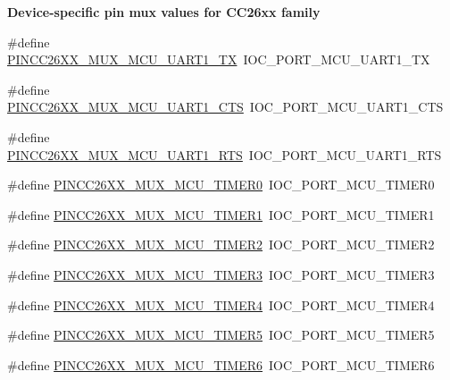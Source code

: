 \begin{Indent}{\bf Device-\/specific pin mux values for C\+C26xx family}
\begin{DoxyCompactItemize}
\item 
\#define \hyperlink{_p_i_n_c_c26_x_x_8h_a86f90a7c527db111500f481c32503c0e}{P\+I\+N\+C\+C26\+X\+X\+\_\+\+M\+U\+X\+\_\+\+M\+C\+U\+\_\+\+U\+A\+R\+T1\+\_\+\+T\+X}~I\+O\+C\+\_\+\+P\+O\+R\+T\+\_\+\+M\+C\+U\+\_\+\+U\+A\+R\+T1\+\_\+\+T\+X
\item 
\#define \hyperlink{_p_i_n_c_c26_x_x_8h_a7e579ca0aee2428813b15c97ba23d28b}{P\+I\+N\+C\+C26\+X\+X\+\_\+\+M\+U\+X\+\_\+\+M\+C\+U\+\_\+\+U\+A\+R\+T1\+\_\+\+C\+T\+S}~I\+O\+C\+\_\+\+P\+O\+R\+T\+\_\+\+M\+C\+U\+\_\+\+U\+A\+R\+T1\+\_\+\+C\+T\+S
\item 
\#define \hyperlink{_p_i_n_c_c26_x_x_8h_a19de716646ff8365a45a1111c5d41979}{P\+I\+N\+C\+C26\+X\+X\+\_\+\+M\+U\+X\+\_\+\+M\+C\+U\+\_\+\+U\+A\+R\+T1\+\_\+\+R\+T\+S}~I\+O\+C\+\_\+\+P\+O\+R\+T\+\_\+\+M\+C\+U\+\_\+\+U\+A\+R\+T1\+\_\+\+R\+T\+S
\item 
\#define \hyperlink{_p_i_n_c_c26_x_x_8h_ab6adbeb3876713207934393f6e3ea98b}{P\+I\+N\+C\+C26\+X\+X\+\_\+\+M\+U\+X\+\_\+\+M\+C\+U\+\_\+\+T\+I\+M\+E\+R0}~I\+O\+C\+\_\+\+P\+O\+R\+T\+\_\+\+M\+C\+U\+\_\+\+T\+I\+M\+E\+R0
\item 
\#define \hyperlink{_p_i_n_c_c26_x_x_8h_a3920a9c6a9d4e7111672d9db47dd2f0f}{P\+I\+N\+C\+C26\+X\+X\+\_\+\+M\+U\+X\+\_\+\+M\+C\+U\+\_\+\+T\+I\+M\+E\+R1}~I\+O\+C\+\_\+\+P\+O\+R\+T\+\_\+\+M\+C\+U\+\_\+\+T\+I\+M\+E\+R1
\item 
\#define \hyperlink{_p_i_n_c_c26_x_x_8h_a0f58eb941ff925a8b03cd2bb482471eb}{P\+I\+N\+C\+C26\+X\+X\+\_\+\+M\+U\+X\+\_\+\+M\+C\+U\+\_\+\+T\+I\+M\+E\+R2}~I\+O\+C\+\_\+\+P\+O\+R\+T\+\_\+\+M\+C\+U\+\_\+\+T\+I\+M\+E\+R2
\item 
\#define \hyperlink{_p_i_n_c_c26_x_x_8h_aae7f9981ad149939a03138af56f6f65f}{P\+I\+N\+C\+C26\+X\+X\+\_\+\+M\+U\+X\+\_\+\+M\+C\+U\+\_\+\+T\+I\+M\+E\+R3}~I\+O\+C\+\_\+\+P\+O\+R\+T\+\_\+\+M\+C\+U\+\_\+\+T\+I\+M\+E\+R3
\item 
\#define \hyperlink{_p_i_n_c_c26_x_x_8h_abe7dc70b7e11903c65cd712f0d7f9c06}{P\+I\+N\+C\+C26\+X\+X\+\_\+\+M\+U\+X\+\_\+\+M\+C\+U\+\_\+\+T\+I\+M\+E\+R4}~I\+O\+C\+\_\+\+P\+O\+R\+T\+\_\+\+M\+C\+U\+\_\+\+T\+I\+M\+E\+R4
\item 
\#define \hyperlink{_p_i_n_c_c26_x_x_8h_a1dfa83441369f987a042dd2e5b9b5bca}{P\+I\+N\+C\+C26\+X\+X\+\_\+\+M\+U\+X\+\_\+\+M\+C\+U\+\_\+\+T\+I\+M\+E\+R5}~I\+O\+C\+\_\+\+P\+O\+R\+T\+\_\+\+M\+C\+U\+\_\+\+T\+I\+M\+E\+R5
\item 
\#define \hyperlink{_p_i_n_c_c26_x_x_8h_a919f7a43fa29974e94f356c3ef0cb3a2}{P\+I\+N\+C\+C26\+X\+X\+\_\+\+M\+U\+X\+\_\+\+M\+C\+U\+\_\+\+T\+I\+M\+E\+R6}~I\+O\+C\+\_\+\+P\+O\+R\+T\+\_\+\+M\+C\+U\+\_\+\+T\+I\+M\+E\+R6

\end{DoxyCompactItemize}
\end{Indent}

